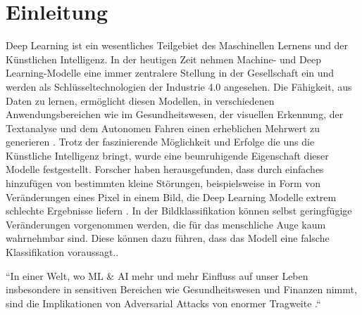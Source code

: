 \section{Einleitung}

Deep Learning ist ein wesentliches Teilgebiet des Maschinellen Lernens und der Künstlichen Intelligenz. In der heutigen Zeit nehmen Machine- und Deep Learning-Modelle eine immer zentralere Stellung in der Gesellschaft ein und werden als Schlüsseltechnologien der Industrie 4.0 angesehen. Die Fähigkeit, aus Daten zu lernen, ermöglicht diesen Modellen, in verschiedenen Anwendungsbereichen wie im Gesundheitswesen, der visuellen Erkennung, der Textanalyse und dem Autonomen Fahren einen erheblichen Mehrwert zu generieren \cite{sarker_deep_2021}. Trotz der faszinierende Möglichkeit und Erfolge die uns die Künstliche Intelligenz bringt, wurde eine beunruhigende Eigenschaft dieser Modelle festgestellt. Forscher haben herausgefunden, dass durch einfaches hinzufügen von bestimmten kleine Störungen, beispielsweise in Form von Veränderungen eines Pixel in einem Bild, die Deep Learning Modelle extrem schlechte Ergebnisse liefern \cite{szegedy_intriguing_2014}. In der Bildklassifikation können selbst geringfügige Veränderungen vorgenommen werden, die für das menschliche Auge kaum wahrnehmbar sind. Diese können dazu führen, dass das Modell eine falsche Klassifikation voraussagt.\cite{perruchoud_24fs_i4ds27_2023}. 

``In einer Welt, wo ML \& AI mehr und mehr Einfluss auf unser Leben insbesondere in sensitiven Bereichen wie Gesundheitswesen und Finanzen nimmt, sind die Implikationen von Adversarial Attacks von enormer Tragweite \cite{perruchoud_24fs_i4ds27_2023}.`` 
